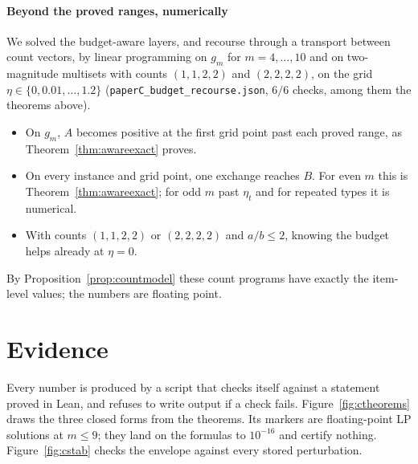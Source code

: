 \paragraph{Beyond the proved ranges, numerically} \NUM{} We solved the budget-aware layers, and
recourse through a transport between count vectors, by linear programming on $g_m$ for
$m=4,\dots,10$ and on two-magnitude multisets with counts $(1,1,2,2)$ and $(2,2,2,2)$, on the
grid $\eta\in\{0,0.01,\dots,1.2\}$ (\texttt{paperC\_budget\_recourse.json}, $6/6$ checks, among them the theorems above).
\begin{itemize}
\item On $g_m$, $A$ becomes positive at the first grid point past each proved range, as
Theorem~\ref{thm:awareexact} proves.
\item On every instance and grid point, one exchange reaches $B$. For even $m$ this is
Theorem~\ref{thm:awareexact}; for odd $m$ past $\eta_t$ and for repeated types it is numerical.
\item With counts $(1,1,2,2)$ or $(2,2,2,2)$ and $a/b\le2$, knowing the budget helps already at
$\eta=0$.
\end{itemize}
By Proposition~\ref{prop:countmodel} these count programs have exactly the item-level values; the
numbers are floating point.

\section{Evidence}
\label{sec:evidence}

Every number is produced by a script that checks itself against a statement proved in Lean,
and refuses to write output if a check fails. Figure~\ref{fig:ctheorems} draws the three
closed forms from the theorems. Its markers are floating-point LP solutions at $m\le9$; they
land on the formulas to $10^{-16}$ and certify nothing. Figure~\ref{fig:cstab} checks the
envelope against every stored perturbation.

